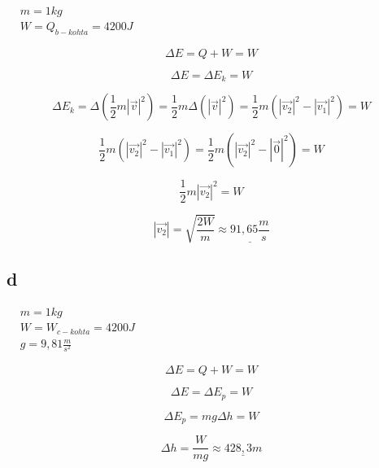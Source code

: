 \documentclass[12pt,a4paper,finnish]{article}
\begin{document}
\begin{math}
 \begin{aligned}
  &m = 1 kg\\
  &W = Q_{b-kohta} = 4200 J
 \end{aligned}
\end{math}

\begin{equation}
 \Delta E = Q + W = W
\end{equation}

\begin{equation}
 \Delta E = \Delta E_k = W
\end{equation}

\begin{equation}
 \Delta E_k = \Delta \left(\frac{1}{2}m|\vec{v}|^2\right) = \frac{1}{2}m\Delta\left(|\vec{v}|^2\right) = 
  \frac{1}{2}m\left(|\vec{v_2}|^2 -|\vec{v_1}|^2\right) = W
\end{equation}

\begin{equation}
 \frac{1}{2}m\left(|\vec{v_2}|^2 -|\vec{v_1}|^2\right) = \frac{1}{2}m\left(|\vec{v_2}|^2 -|\vec{0}|^2\right)
  = W
\end{equation}

\begin{equation}
 \frac{1}{2}m|\vec{v_2}|^2= W
\end{equation}

\begin{equation}
 |\vec{v_2}| = \sqrt{\frac{2W}{m}} \approx \underline{91,65 \frac{m}{s}}
\end{equation}

\subsection{d}

\begin{math}
 \begin{aligned}
  &m = 1 kg\\
  &W = W_{c-kohta} = 4200 J\\
  &g = 9,81 \frac{m}{s^2}
 \end{aligned}
\end{math}

\begin{equation}
 \Delta E = Q + W = W
\end{equation}

\begin{equation}
 \Delta E = \Delta E_p = W
\end{equation}

\begin{equation}
 \Delta E_p = mg\Delta h = W
\end{equation}

\begin{equation}
 \Delta h = \frac{W}{mg} \approx \underline{428,3 m}
\end{equation}
\end{document}
